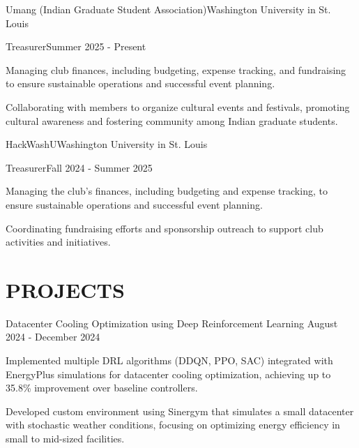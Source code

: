 \documentclass[10pt, letterpaper]{article}
\begin{document}
\vspace{\entrySpacing}
\begin{leadershipentry}{Umang (Indian Graduate Student Association)}{Washington University in St. Louis}
  \begin{positionentry}{Treasurer}{Summer 2025 - Present}
    \item Managing club finances, including budgeting, expense tracking, and fundraising to ensure sustainable operations and successful event planning.
    \item Collaborating with members to organize cultural events and festivals, promoting cultural awareness and fostering community among Indian graduate students.
  \end{positionentry}
\end{leadershipentry}

\vspace{\entrySpacing}
\begin{leadershipentry}{HackWashU}{Washington University in St. Louis}
  \begin{positionentry}{Treasurer}{Fall 2024 - Summer 2025}
    \item Managing the club's finances, including budgeting and expense tracking, to ensure sustainable operations and successful event planning.
    \item Coordinating fundraising efforts and sponsorship outreach to support club activities and initiatives.
  \end{positionentry}
\end{leadershipentry}

\vspace{\headerSpacing}

\section{PROJECTS}

\vspace{\entrySpacing}
\begin{projectentry}
  {Datacenter Cooling Optimization using Deep Reinforcement Learning} %
  {August 2024 - December 2024} %
  \item Implemented multiple DRL algorithms (DDQN, PPO, SAC) integrated with EnergyPlus simulations for datacenter cooling optimization, achieving up to 35.8\% improvement over baseline controllers.
  \item Developed custom environment using Sinergym that simulates a small datacenter with stochastic weather conditions, focusing on optimizing energy efficiency in small to mid-sized facilities.
\end{projectentry}
\end{document}
